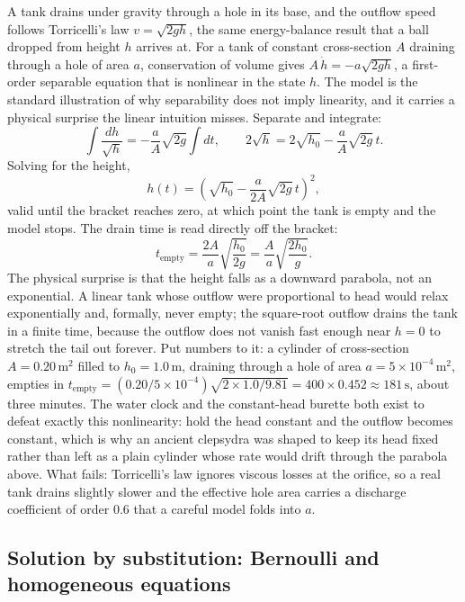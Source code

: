 A tank drains under gravity through a hole in its base, and the outflow
speed follows Torricelli's law $v = \sqrt{2 g h}$, the same
energy-balance result that a ball dropped from height $h$ arrives at.
For a tank of constant cross-section $A$ draining through a hole of area
$a$, conservation of volume gives $A\,\dot{h} = -a\sqrt{2 g h}$, a
first-order separable equation that is nonlinear in the state $h$. The
model is the standard illustration of why separability does not imply
linearity, and it carries a physical surprise the linear intuition
misses. Separate and integrate:
\[
\int \frac{dh}{\sqrt{h}} = -\frac{a}{A}\sqrt{2 g}\int dt,
\qquad
2\sqrt{h} = 2\sqrt{h_{0}} - \frac{a}{A}\sqrt{2 g}\, t.
\]
Solving for the height,
\[
h(t) = \left(\sqrt{h_{0}} - \frac{a}{2 A}\sqrt{2 g}\, t\right)^{2},
\]
valid until the bracket reaches zero, at which point the tank is empty
and the model stops. The drain time is read directly off the bracket:
\[
t_{\text{empty}} = \frac{2 A}{a}\sqrt{\frac{h_{0}}{2 g}}
= \frac{A}{a}\sqrt{\frac{2 h_{0}}{g}}.
\]
The physical surprise is that the height falls as a downward parabola,
not an exponential. A linear tank whose outflow were proportional to
head would relax exponentially and, formally, never empty; the
square-root outflow drains the tank in a finite time, because the
outflow does not vanish fast enough near $h = 0$ to stretch the tail out
forever. Put numbers to it: a cylinder of cross-section $A =
0.20\,\si{\meter\squared}$ filled to $h_{0} = 1.0\,\si{\meter}$,
draining through a hole of area $a = 5\times 10^{-4}\,\si{\meter
\squared}$, empties in $t_{\text{empty}} = (0.20/5\times 10^{-4})\sqrt{2
\times 1.0/9.81} = 400 \times 0.452 \approx 181\,\si{\second}$, about
three minutes. The water clock and the constant-head burette both exist
to defeat exactly this nonlinearity: hold the head constant and the
outflow becomes constant, which is why an ancient clepsydra was shaped
to keep its head fixed rather than left as a plain cylinder whose rate
would drift through the parabola above. What fails: Torricelli's law
ignores viscous losses at the orifice, so a real tank drains slightly
slower and the effective hole area carries a discharge coefficient of
order $0.6$ that a careful model folds into $a$.

\subsection{Solution by substitution: Bernoulli and homogeneous equations}

